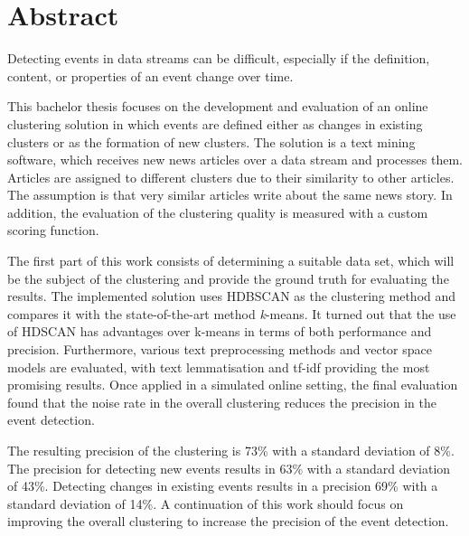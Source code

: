 \section*{Abstract}

Detecting events in data streams can be difficult,
especially if the definition, content, or properties of an event change over time.

This bachelor thesis focuses on the development and evaluation of an online clustering solution
in which events are defined either as changes in existing clusters or as the formation of new clusters.
The solution is a text mining software, which receives new news articles over a data stream and processes them.
Articles are assigned to different clusters due to their similarity to other articles.
The assumption is that very similar articles write about the same news story.
In addition, the evaluation of the clustering quality is measured with a custom scoring function.

The first part of this work consists of determining a suitable data set,
which will be the subject of the clustering and provide the ground truth for evaluating the results.
The implemented solution uses HDBSCAN as the clustering method
and compares it with the state-of-the-art method \textit{k}-means.
It turned out that the use of HDSCAN has advantages over k-means in terms of both performance and precision.
Furthermore, various text preprocessing methods and vector space models are evaluated,
with text lemmatisation and tf-idf providing the most promising results.
Once applied in a simulated online setting,
the final evaluation found that the noise rate in the overall clustering reduces the precision in the event detection.

The resulting precision of the clustering is 73\% with a standard deviation of 8\%.
The precision for detecting new events results in 63\% with a standard deviation of 43\%.
Detecting changes in existing events results in a precision 69\% with a standard deviation of 14\%.
A continuation of this work should focus on improving the overall clustering to increase the precision of the event detection.
